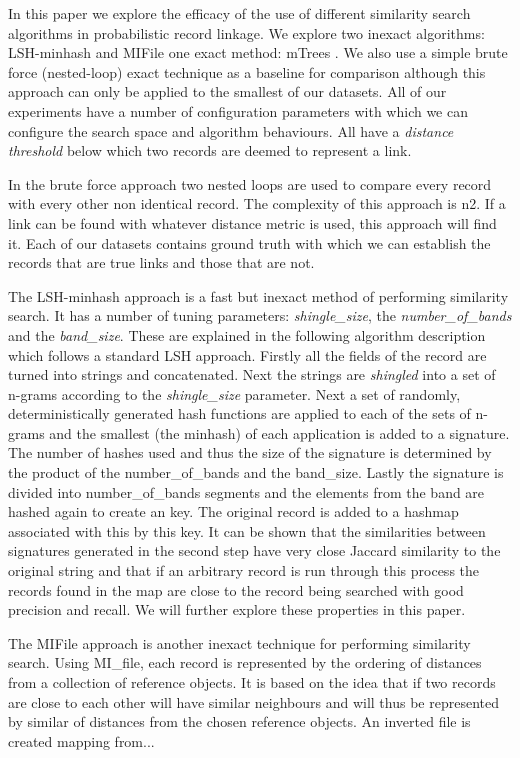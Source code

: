 \documentclass{llncs}
\begin{document}
In this paper we explore the efficacy of the use of different similarity search algorithms in probabilistic record linkage. We explore two inexact algorithms: LSH-minhash and MIFile \cite{amato2014mi} one exact method: mTrees \cite{paolociaccia2m}. We also use a simple brute force (nested-loop) exact technique as a baseline for comparison although this approach can only be applied to the smallest of our datasets. All of our experiments have a number of configuration parameters with which we can configure the search space and algorithm behaviours. All have a \textit{distance threshold} below which two records are deemed to represent a link.

In the brute force approach two nested loops are used to compare every record with every other non identical record. The complexity of this approach is n2. If a link can be found with whatever distance metric is used, this approach will find it. Each of our datasets contains ground truth with which we can establish the records that are true links and those that are not. 

The LSH-minhash approach is a fast but inexact method of performing similarity search. It has a number of tuning parameters: \textit{shingle\_size}, the \textit{number\_of\_bands} and the \textit{band\_size}. These are explained in the following algorithm description which follows a standard LSH approach. Firstly all the fields of the record are turned into strings and concatenated. Next the strings are \textit{shingled} into a set of n-grams according to the \textit{shingle\_size} parameter. Next a set of randomly, deterministically generated hash functions are applied to each of the sets of n-grams and the smallest (the minhash) of each application is added to a signature. The number of hashes used and thus the size of the signature is determined by the product of the {number\_of\_bands} and the {band\_size}.  Lastly the signature is divided into {number\_of\_bands} segments and the elements from the band are hashed again to create an key. The original record is added to a hashmap associated with this by this key. It can be shown that the similarities between signatures generated in the second step have very close Jaccard similarity to the original string and that if an arbitrary record is run through this process the records found in the map are close to the record being searched with good precision and recall. We will further explore these properties in this paper.

The MIFile \cite{amato2014mi} approach is another inexact technique for performing similarity search. Using  MI\_file,  each record is represented by the ordering of distances from a collection of reference objects. It is based on the idea that if two records are close to each other  will have similar neighbours and will thus be represented by similar of distances from the chosen reference objects. An inverted file is created mapping from... 
\end{document}
